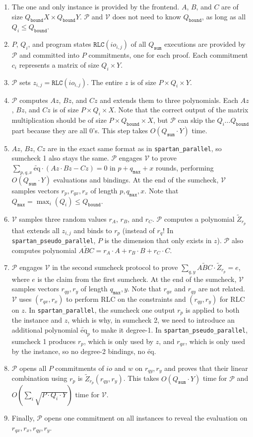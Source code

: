 \documentclass{article}
\newcommand{\red}[1] {\color{red}#1\color{black}}
\newcommand{\code}{\texttt}
\newcommand{\Qbound}{Q_{\mathtt{bound}}}
\newcommand{\Qsum}{Q_{\mathtt{sum}}}
\newcommand{\Qmax}{Q_{\mathtt{max}}}
\newcommand{\qmax}{q_{\mathtt{max}}}
\renewcommand{\P}{\mathcal{P}}
\newcommand{\V}{\mathcal{V}}
\newcommand{\RLC}{\mathtt{RLC}}
\newcommand{\Z}{\widetilde{Z}}
\newcommand{\ABC}{\widetilde{ABC}}
\newcommand{\eq}{\widetilde{\mbox{eq}}}
\begin{document}
\begin{enumerate}
    \item The one and only instance is provided by the frontend. $A$, $B$, and $C$ are of size $\Qbound X\times \Qbound Y$. $\P$ and $\V$ does not need to know $\Qbound$, as long as all $Q_i \leq \Qbound$.
    \item $P$, $Q_i$, and program states $\RLC(io_{i, j})$ of all $\Qsum$ executions are provided by $\P$ and committed into $P$ commitments, one for each proof. Each commitment $c_i$ represents a matrix of size $Q_i \times Y$.
    \item $\P$ sets $z_{i, j} = \RLC(io_{i, j})$. The entire $z$ is of size $P\times Q_i\times Y$.
    \item $\P$ computes $Az$, $Bz$, and $Cz$ and extends them to three polynomials. Each $Az$, $Bz$, and $Cz$ is of size $P\times Q_i \times X$. Note that the correct output of the matrix multiplication should be of size $P\times \Qbound \times X$, but $\P$ can skip the $Q_i \dots \Qbound$ part because they are all 0's. This step takes $O(\Qsum\cdot Y)$ time.
    \item $Az$, $Bz$, $Cz$ are in the exact same format as in \code{spartan\_parallel}, so sumcheck 1 also stays the same. $\P$ engages $\V$ to prove $\sum_{p, q, x} \eq\cdot (Az \cdot Bz - Cz) = 0$ in $p + \qmax + x$ rounds, performing $O(\Qsum\cdot Y)$ evaluations and bindings. At the end of the sumcheck, $\V$ samples vectors $r_p, r_{qx}, r_x$ of length $p, \qmax, x$. Note that $\Qmax = \max_i(Q_i)\leq\Qbound$.
    \item $\V$ samples three random values $r_A$, $r_B$, and $r_C$. $\P$ computes a polynomial $\Z_{r_p}$ that extends all $z_{i, j}$ and binds to $r_p$ (instead of $r_q$! In \code{spartan\_pseudo\_parallel}, $P$ is the dimension that only exists in $z$). $\P$ also computes polynomial $\ABC = r_A\cdot A + r_B\cdot B + r_C\cdot C$.
    \item $\P$ engages $\V$ in the second sumcheck protocol to prove $\sum_{q, y} \ABC \cdot \Z_{r_p} = e$, where $e$ is the claim from the first sumcheck. At the end of the sumcheck, $\V$ samples vectors $r_{qy}, r_y$ of length $\qmax, y$. Note that $r_{qx}$ and $r_{qy}$ are not related. $\V$ uses $(r_{qx}, r_x)$ to perform RLC on the constraints and $(r_{qy}, r_y)$ for RLC on $z$. \red{In \code{spartan\_parallel}, the sumcheck one output $r_p$ is applied to both the instance and $z$, which is why, in sumcheck 2, we need to introduce an additional polynomial $\eq_p$ to make it degree-1. In \code{spartan\_pseudo\_parallel}, sumcheck 1 produces $r_p$, which is only used by $z$, and $r_{qx}$, which is only used by the instance, so no degree-2 bindings, no $\eq$.}
    \item $\P$ opens all $P$ commitments of $io$ and $w$ on $r_{qy}, r_y$ and proves that their linear combination using $r_p$ is $\Z_{r_p}(r_{qy}, r_y)$. This takes $O(\Qsum\cdot Y)$ time for $\P$ and $O(\sum_i\sqrt{P\cdot Q_i\cdot Y})$ time for $\V$.
    \item Finally, $\P$ opens one commitment on all instances to reveal the evaluation on $r_{qx}, r_x, r_{qy}, r_y$.
\end{enumerate}
\end{document}
